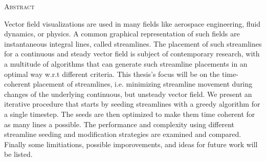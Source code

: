 
\begin{center}
  \textsc{Abstract}
\end{center}
%
\noindent
Vector field visualizations are used in many fields like aerospace engineering, fluid dynamics, or physics.
A common graphical representation of such fields are instantaneous integral lines, called streamlines.
The placement of such streamlines for a continuous and steady vector field is subject of contemporary research,
with a multitude of algorithms that can generate such streamline placements in an optimal way w.r.t different criteria.
This thesis's focus will be on the time-coherent placement of streamlines, i.e. minimizing streamline movement during changes of the underlying continuous, but unsteady vector field.
We present an iterative procedure that starts by seeding streamlines with a greedy algorithm for a single timestep.
The seeds are then optimized to make them time coherent for as many lines a possible.
The performance and complexity using different streamline seeding and modification strategies are examined and compared.
Finally some limitiations, possible imporovements, and ideas for future work will be listed. 
\cleardoublepage

